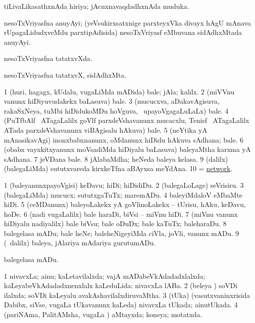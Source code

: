 \bentry
{}
\gl{\nA}
\bmng
 tiLivaLikasathxnAda hiriya; jAcnxnavaqdadhxnAda muduka. 
\emng
\eentry

\bentry
{}
\gl{\nA}
\bmng
nesoTxVriyasfna anuyAyi; (yeVsukirxsatxnige parxteyxVka divayx hAgU mAnava rUpagaLidudxveMdu parxtipAdisida) nesoTxVriyasf eMbuvana sidAdhxMtada anuyAyi. 
\emng
\eentry

\bentry
{}
\gl{\gu}
\bmng
nesoTxVriyasfna tatatxvXda. 
\emng
\eentry

\bentry
{}
\gl{\nA}
\bmng
nesoTxVriyasfna tatatxvX, sidAdhxMta. 
\emng
\eentry

\bentry
{}
\gl{\nA}
\bmng
\bnum
\num{1} (huri, hagagx, kUdalu, \mo vugaLiMda mADida) bale; jAla; kalilx. 
\num{2} (miVVnu \mo vanunx hiDiyuvudakekx baLasuva) bale. 
\num{3} (mucucxva, aDakavAgisuva, rakaSxNeya, tuMbi hiDidukoMDu hoVguva, \mo\ upayoVgagaLuLaLx) bale. 
\num{4} (PuTfbAlf \mo\ ATagaLalilx goVlf parxdeVshavanunx mucacxlu, Tenisf \mo\ ATagaLalilx ATada parxdeVshavanunx viBAgisalu hAkuva) bale. 
\num{5} (neYtika yA mAnasikavAgi) inonxbabxnanunx, oMdanunx hiDidu hAkuva sAdhana; bale. 
\num{6} (obabx vayxkitxyanunx moVsadiMda hiDiyalu baLasuva) baleyaMtha karxma yA sAdhana. 
\num{7} jeVDana bale. 
\num{8} jAlabaMdha; heNeda baleya kelasa. 
\num{9} (\bava dalilx) (balegaLiMda) sututxvareda kirxkeTfna aBAyxsa meYdAna. 
\num{10} = \hyperlink{network(1)}{network}. 
\enum
\emng
\eentry

\bentry
{}
\gl{\sakirx}
\bmng
\bnum
\num{1} (baleyanunxpayoVgisi) keDavu; hiDi; hiDidiDu. 
\num{2} (balegaLoLage) seVrisiru. 
\num{3} (balegaLiMda) mucucx; sututxgaTuTx; maremADu. 
\num{4} baleyiMdaloV eMbaMte hiDi. 
\num{5} (ceMDanunx) baleyoLakekx yA goVlinoLakekx -- tUrisu, hAku, keDavu, hoDe. 
\num{6} (nadi \mo vugaLalilx) bale haraDi, biVsi -- miVnu hiDi. 
\num{7} (miVnu \mo vanunx hiDiyalu nadiyalilx) bale biVsu; bale oDuDx; bale kaTuTx; baleharaDu. 
\num{8} balegelasa mADu; bale heNe; baleheNigeyiMda ciVla, joVli, \mo vanunx mADu. 
\num{9} (\sA\ \BUkaq dalilx) baleya, jAlariya mAdariya gurutumADu. 
\enum
\emng

\noindent
\gl{\akirx}
\expl{}
\bmng
balegelasa mADu. 
\emng
\eentry

\bentry
{}
\gl{\gu}
\bmng
\bnum
\num{1} nivavxLa; ainu; kaLetavilalxda; vajA mADabeVkAdadadxlalxda; kaLeyabeVkAdadadxnenxlalx kaLeduLida:  nivavxLa lABa. 
\num{2} (beleya \vi) soVDi ilalxda; soVDi kaLeyalu avakAshavilalxdiruvaMtha. 
\num{3} (tUka) (vasutxvaninxrisida Dabibx, siVse, \mo vugaLa tUkavanunx kaLeda) nivavxLa tUkada; ainutUkada. 
\num{4} (pariNAma, PalitAMsha, \mo vugaLa \vi) aMtayxda; koneya; motatxda. 
\enum
\emng

